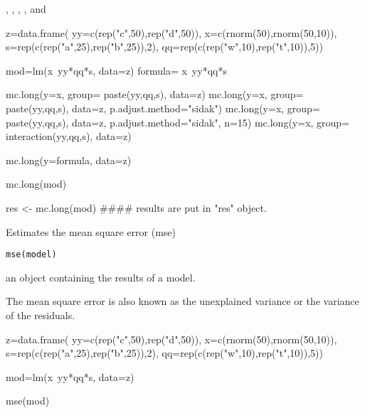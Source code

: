 \documentclass[a4paper]{book}
\begin{document}
%
\begin{SeeAlso}\relax
{}, , , ,  and 
\end{SeeAlso}
%
\begin{Examples}
\begin{ExampleCode}

z=data.frame( yy=c(rep("c",50),rep("d",50)),
              x=c(rnorm(50),rnorm(50,10)),
              s=rep(c(rep("a",25),rep("b",25)),2),
              qq=rep(c(rep("w",10),rep("t",10)),5))

mod=lm(x~yy*qq*s, data=z)
formula= x~yy*qq*s

mc.long(y=x, group= paste(yy,qq,s), data=z)
mc.long(y=x, group= paste(yy,qq,s), data=z, p.adjust.method="sidak")
mc.long(y=x, group= paste(yy,qq,s), data=z, p.adjust.method="sidak", n=15)
mc.long(y=x, group= interaction(yy,qq,s), data=z)

mc.long(y=formula, data=z)

mc.long(mod)

res <- mc.long(mod)   #### results are put in "res" object.

\end{ExampleCode}
\end{Examples}
\newpage
{}
%
\begin{Description}\relax
Estimates the mean square error (mse)
\end{Description}
%
\begin{Usage}
\begin{verbatim}
mse(model)
\end{verbatim}
\end{Usage}
%
\begin{Arguments}
\begin{ldescription}
\item[\code{model}] an object containing the results of a model. 


\end{ldescription}
\end{Arguments}
%
\begin{Details}\relax
The mean square error is also known as the unexplained variance or the variance of the residuals.
\end{Details}
%
\begin{Examples}
\begin{ExampleCode}
z=data.frame( yy=c(rep("c",50),rep("d",50)),
              x=c(rnorm(50),rnorm(50,10)),
              s=rep(c(rep("a",25),rep("b",25)),2),
              qq=rep(c(rep("w",10),rep("t",10)),5))

mod=lm(x~yy*qq*s, data=z)

mse(mod)

\end{ExampleCode}
\end{Examples}
\end{document}
